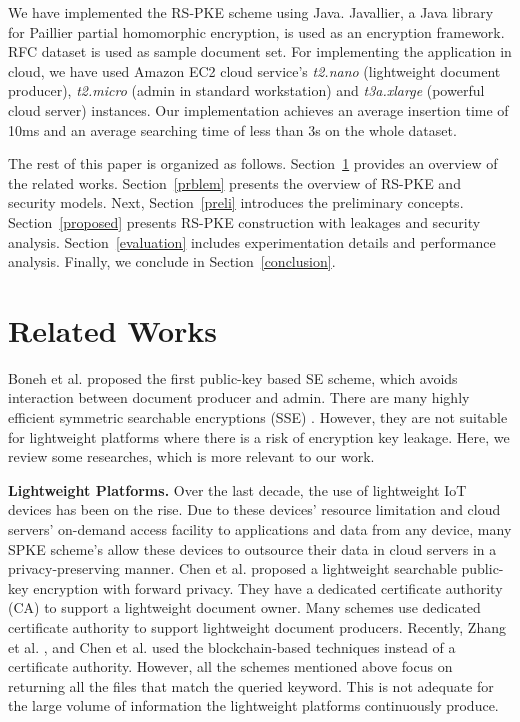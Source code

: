 \documentclass[sigconf,pdftex]{acmart}
\begin{document}
We have implemented the RS-PKE scheme using Java. Javallier, a Java library for Paillier partial homomorphic encryption, is used as an encryption framework. RFC \cite{rfc} dataset is used as sample document set. For implementing the application in cloud, we have used Amazon EC2 cloud service's \textit{t2.nano} (lightweight document producer), \textit{t2.micro} (admin in standard workstation) and \textit{t3a.xlarge} (powerful cloud server) instances. Our implementation achieves an average insertion time of 10ms and an average searching time of less than 3s on the whole dataset.
  


The rest of this paper is organized as follows. Section~\ref{related} provides an overview of the related works. Section~\ref{prblem} presents the overview of RS-PKE and security models. Next, Section~\ref{preli} introduces the preliminary concepts. Section~\ref{proposed} presents RS-PKE construction with leakages and security analysis. Section~\ref{evaluation} includes experimentation details and performance analysis. Finally, we conclude in Section~\ref{conclusion}.





\section{Related Works}\label{related}


Boneh et al. \cite{boneh2004public} proposed the first public-key based SE scheme, which avoids interaction between document producer and admin. There are many highly efficient symmetric searchable encryptions (SSE) \cite{song2000practical, xia2015secure, stefanov2014practical}. However, they are not suitable for lightweight platforms where there is a risk of encryption key leakage. Here, we review some researches, which is more relevant to our work.


\textbf{Lightweight Platforms.} Over the last decade, the use of lightweight IoT devices has been on the rise. Due to these devices' resource limitation and cloud servers' on-demand access facility to applications and data from any device, many SPKE scheme's \cite{chen2019lightweight, chen2020a, miao2019lightweight, zhang2019fs, zhang2019blockchain} allow these devices to outsource their data in cloud servers in a privacy-preserving manner. Chen et al. \cite{chen2019lightweight} proposed a lightweight searchable public-key encryption with forward privacy. They have a dedicated certificate authority (CA) to support a lightweight document owner. Many schemes use dedicated certificate authority to support lightweight document producers. Recently, Zhang et al. \cite{zhang2019blockchain}, and Chen et al. \cite{chen2020a} used the blockchain-based techniques instead of a certificate authority. However, all the schemes mentioned above focus on returning all the files that match the queried keyword. This is not adequate for the large volume of information the lightweight platforms continuously produce.
\end{document}
